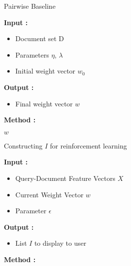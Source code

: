 \documentclass{acm_proc_article-sp}
\begin{document}
\begin{algorithm}[t]
\caption{Pairwise Baseline}
\begin{spacing}{0.9}
\begin{algorithmic}
\STATE \textbf{Input :} \begin{itemize}
\item Document set D
\item Parameters $\eta$, $\lambda$
\item Initial weight vector $w_0$
 \end{itemize}
\STATE \textbf{Output :} \begin{itemize}
\item Final weight vector $w$
 \end{itemize}
\STATE \textbf{Method :}
\begin{enumerate}
\ENDIF
\ENDFOR
\ENDFOR
\RETURN $w$
\end{enumerate}
\end{algorithmic}
\end{spacing}
\label{baseline}
\end{algorithm}


\begin{algorithm}[t]
\caption{Constructing $I$ for reinforcement learning}
\begin{spacing}{0.9}
\begin{algorithmic}
\STATE \textbf{Input :} \begin{itemize}
\item Query-Document Feature Vectors $X$
\item Current Weight Vector $w$
\item Parameter $\epsilon$
 \end{itemize}
\STATE \textbf{Output :} \begin{itemize}
\item List $I$ to display to user
 \end{itemize}
\STATE \textbf{Method :}
\begin{enumerate}
\ENDWHILE
{}
\end{enumerate}
\end{algorithmic}
\end{spacing}
\label{reinforce}
\end{algorithm}
\end{document}
